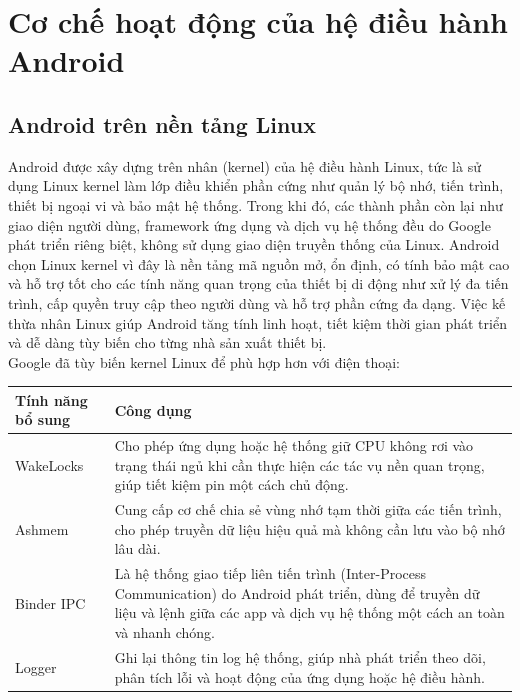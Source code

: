 \section{Cơ chế hoạt động của hệ điều hành Android}

\subsection{Android trên nền tảng Linux}
\renewcommand{\labelitemi}{--}    
\begin{flushleft}
    \hspace*{0.8cm}Android được xây dựng trên nhân (kernel) của hệ điều hành Linux, tức là sử dụng Linux kernel làm lớp điều khiển phần cứng như quản lý bộ nhớ, tiến trình, thiết bị ngoại vi và bảo mật hệ thống. Trong khi đó, các thành phần còn lại như giao diện người dùng, framework ứng dụng và dịch vụ hệ thống đều do Google phát triển riêng biệt, không sử dụng giao diện truyền thống của Linux. Android chọn Linux kernel vì đây là nền tảng mã nguồn mở, ổn định, có tính bảo mật cao và hỗ trợ tốt cho các tính năng quan trọng của thiết bị di động như xử lý đa tiến trình, cấp quyền truy cập theo người dùng và hỗ trợ phần cứng đa dạng. Việc kế thừa nhân Linux giúp Android tăng tính linh hoạt, tiết kiệm thời gian phát triển và dễ dàng tùy biến cho từng nhà sản xuất thiết bị.\\
    \newpage
    Google đã tùy biến kernel Linux để phù hợp hơn với điện thoại:
    \begin{table}[H]
        \centering
        \renewcommand{\arraystretch}{1.5}
        \begin{tabular}{|p{3.5cm}|p{12cm}|}
            \hline
            \textbf{Tính năng bổ sung} & \textbf{Công dụng} \\
            \hline
            WakeLocks & Cho phép ứng dụng hoặc hệ thống giữ CPU không rơi vào trạng thái ngủ khi cần thực hiện các tác vụ nền quan trọng, giúp tiết kiệm pin một cách chủ động. \\
            \hline
            Ashmem  & Cung cấp cơ chế chia sẻ vùng nhớ tạm thời giữa các tiến trình, cho phép truyền dữ liệu hiệu quả mà không cần lưu vào bộ nhớ lâu dài. \\
            \hline
            Binder IPC & Là hệ thống giao tiếp liên tiến trình (Inter-Process Communication) do Android phát triển, dùng để truyền dữ liệu và lệnh giữa các app và dịch vụ hệ thống một cách an toàn và nhanh chóng. \\
            \hline
            Logger & Ghi lại thông tin log hệ thống, giúp nhà phát triển theo dõi, phân tích lỗi và hoạt động của ứng dụng hoặc hệ điều hành. \\

\end{tabular}
\end{table}
\end{flushleft}
